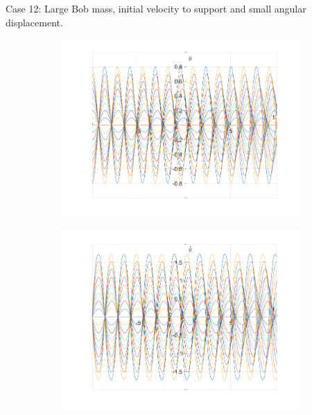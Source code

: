 \documentclass{article}
\begin{document}
	Case 12:
	Large Bob mass, initial velocity to support and small angular displacement.	
	\begin{figure}[h!]
		\centering
		\begin{subfigure}[b]{0.48\linewidth}
			\includegraphics[width=\linewidth]{./SmallOscillations/S12/F1.png}
		\end{subfigure}
		\begin{subfigure}[b]{0.48\linewidth}
			\includegraphics[width=\linewidth]{./SmallOscillations/S12/F2.png}
		\end{subfigure}
	\end{figure}
	
\end{document}
